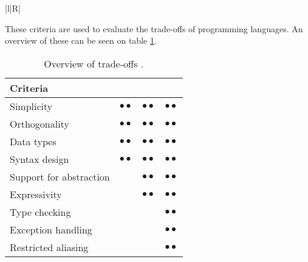 \begin{table}[H]
\begin{tabularx}{\textwidth}{|l|R|}
	\end{tabularx}
	\caption{Brief explanation of language characteristics \citep{sebesta}.}
	\label{tab:langCharacteristics}
\end{table}
These criteria are used to evaluate the trade-offs of programming languages. An overview of these can be seen on table \ref{tab:langTradeOffs}.

\begin{table}[H]
	\begin{tabular}{l|c|c|c|}
\textbf{Criteria}	& \rotatebox{90}{Readability} &\rotatebox{90}{Writability} & \rotatebox{90}{Reliability} \\ \hline
Simplicity 				& $\bullet{•}$	& $\bullet{•}$	& $\bullet{•}$ \\ \hline
Orthogonality			& $\bullet{•}$	& $\bullet{•}$	& $\bullet{•}$ \\ \hline
Data types 				& $\bullet{•}$	& $\bullet{•}$	& $\bullet{•}$ \\ \hline
Syntax design 			& $\bullet{•}$	& $\bullet{•}$	& $\bullet{•}$ \\ \hline
Support for abstraction	& ~ 			& $\bullet{•}$ 	& $\bullet{•}$ \\ \hline
Expressivity 			& ~ 			& $\bullet{•}$ 	& $\bullet{•}$ \\ \hline
Type checking 			& ~ 			& ~ 			& $\bullet{•}$ \\ \hline
Exception handling 		& ~ 			& ~ 			& $\bullet{•}$ \\ \hline
Restricted aliasing 	& ~ 			& ~ 			& $\bullet{•}$ \\ \hline
	\end{tabular}
	\caption{Overview of trade-offs \citep{sebesta}.}
	\label{tab:langTradeOffs}
\end{table}

